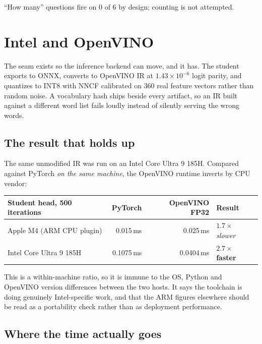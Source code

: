 \documentclass[11pt,a4paper]{article}
\begin{document}
\noindent``How many'' questions fire on 0 of 6 by design; counting is not attempted.

\section{Intel and OpenVINO}

The seam exists so the inference backend can move, and it has. The student exports to
ONNX, converts to OpenVINO IR at $1.43\times10^{-6}$ logit parity, and quantizes to INT8
with NNCF calibrated on 360 real feature vectors rather than random noise. A vocabulary
hash ships beside every artifact, so an IR built against a different word list fails
loudly instead of silently serving the wrong words.

\subsection{The result that holds up}

The same unmodified IR was run on an Intel Core Ultra 9 185H. Compared against PyTorch
\emph{on the same machine}, the OpenVINO runtime inverts by CPU vendor:

\begin{center}
\begin{tabular}{@{}lrrl@{}}
\toprule
\textbf{Student head, 500 iterations} & \textbf{PyTorch} & \textbf{OpenVINO FP32} & \textbf{Result} \\
\midrule
Apple M4 (ARM CPU plugin) & 0.015\,ms  & 0.025\,ms  & $1.7\times$ \emph{slower} \\
Intel Core Ultra 9 185H   & 0.1075\,ms & 0.0404\,ms & $2.7\times$ \textbf{faster} \\
\bottomrule
\end{tabular}
\end{center}

This is a within-machine ratio, so it is immune to the OS, Python and OpenVINO version
differences between the two hosts. It says the toolchain is doing genuinely
Intel-specific work, and that the ARM figures elsewhere should be read as a portability
check rather than as deployment performance.

\subsection{Where the time actually goes}
\end{document}
